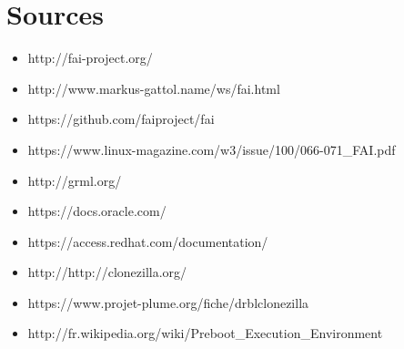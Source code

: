 \documentclass[a4paper,12pt,one side,titlepage]{report}
\begin{document}
\chapter{Sources}
\begin{itemize}
  \item http://fai-project.org/\\
  \item http://www.markus-gattol.name/ws/fai.html\\
  \item https://github.com/faiproject/fai\\
  \item https://www.linux-magazine.com/w3/issue/100/066-071\_FAI.pdf\\
  \item http://grml.org/\\
  \item https://docs.oracle.com/\\
  \item https://access.redhat.com/documentation/\\
  \item http://http://clonezilla.org/\\
  \item https://www.projet-plume.org/fiche/drblclonezilla\\
  \item http://fr.wikipedia.org/wiki/Preboot\_Execution\_Environment\\
\end{itemize}
\end{document}
